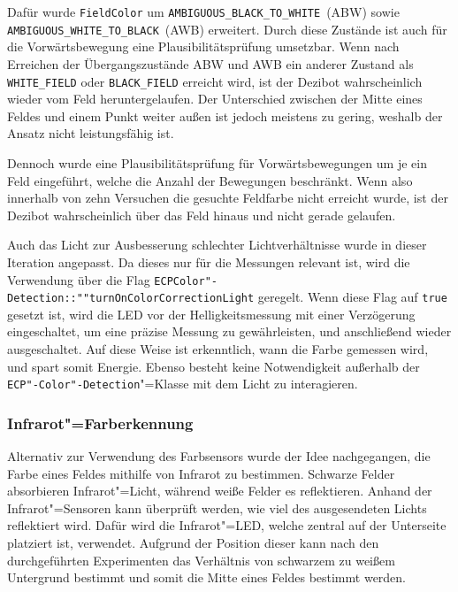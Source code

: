 {Dafür wurde \texttt{Field\-Color} um \texttt{AMBIGUOUS\_BLACK\_TO\_WHITE}~(ABW) sowie \texttt{AMBIGUOUS\_WHITE\_TO\_BLACK}~(AWB) erweitert. Durch diese Zustände ist auch für die Vorwärtsbewegung eine Plausibilitätsprüfung umsetzbar. Wenn nach Erreichen der Übergangszustände ABW und AWB ein anderer Zustand als \texttt{WHITE\_FIELD} oder \texttt{BLACK\_FIELD} erreicht wird, ist der Dezibot wahrscheinlich wieder vom Feld heruntergelaufen. Der Unterschied zwischen der Mitte eines Feldes und einem Punkt weiter außen ist jedoch meistens zu gering, weshalb der Ansatz nicht leistungsfähig ist. 

Dennoch wurde eine Plausibilitätsprüfung für Vorwärtsbewegungen um je ein Feld eingeführt, welche die Anzahl der Bewegungen beschränkt. Wenn also innerhalb von zehn Versuchen die gesuchte Feldfarbe nicht erreicht wurde, ist der Dezibot wahrscheinlich über das Feld hinaus und nicht gerade gelaufen.

Auch das Licht zur Ausbesserung schlechter Lichtverhältnisse wurde in dieser Iteration angepasst. Da dieses nur für die Messungen relevant ist, wird die Verwendung über die Flag \texttt{ECP\-Color"-Detection::""turn\-On\-Color\-Correction\-Light} geregelt. Wenn diese Flag auf \texttt{true} gesetzt ist, wird die LED vor der Helligkeitsmessung mit einer Verzögerung eingeschaltet, um eine präzise Messung zu gewährleisten, und anschließend wieder ausgeschaltet. Auf diese Weise ist erkenntlich, wann die Farbe gemessen wird, und spart somit Energie. Ebenso besteht keine Notwendigkeit außerhalb der \texttt{ECP"-Color"-Detection}"=Klasse mit dem Licht zu interagieren.


\subsubsection{Infrarot"=Farberkennung}
\label{sec:colour-calibration-ir}

Alternativ zur Verwendung des Farbsensors wurde der Idee nachgegangen, die Farbe eines Feldes mithilfe von Infrarot zu bestimmen. Schwarze Felder absorbieren Infrarot"=Licht, während weiße Felder es reflektieren. Anhand der Infrarot"=Sensoren kann überprüft werden, wie viel des ausgesendeten Lichts reflektiert wird. Dafür wird die Infrarot"=LED, welche zentral auf der Unterseite platziert ist, verwendet. Aufgrund der Position dieser kann nach den durchgeführten Experimenten das Verhältnis von schwarzem zu weißem Untergrund bestimmt und somit die Mitte eines Feldes bestimmt werden.

}
